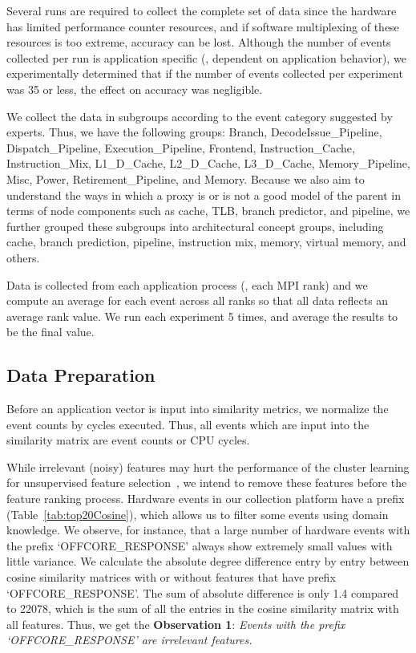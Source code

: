 Several runs are required to collect the complete set of data since the hardware has limited performance counter resources, and if software multiplexing of these resources is too extreme, accuracy can be lost. Although the number of events collected per run is application specific (\ie, dependent on application behavior), we experimentally determined that if the number of events collected per experiment was 35 or less, the effect on accuracy was negligible. 

We collect the data in subgroups according to the event category suggested by experts. Thus, we have the following groups: Branch, DecodeIssue\_Pipeline, Dispatch\_Pipeline, Execution\_Pipeline, Frontend, Instruction\_Cache, Instruction\_Mix, L1\_D\_Cache, L2\_D\_Cache, L3\_D\_Cache, Memory\_Pipeline, Misc, Power, Retirement\_Pipeline, and Memory. Because we also aim to understand the ways in which a proxy is or is not a good model of the parent in terms of node components such as cache, TLB, branch predictor, and pipeline, we further grouped these subgroups into architectural concept groups, including cache, branch prediction, pipeline, instruction mix, memory, virtual memory, and others.

Data is collected from each application process (\ie, each MPI rank) and we compute an average for each event across all ranks so that all data reflects an average rank value. We run each experiment 5 times, and average the results to be the final value.

\subsection{Data Preparation}
\label{sec:prep}
Before an application vector is input into similarity metrics, we normalize the event counts by cycles executed. Thus, all events which are input into the similarity matrix are event counts or CPU cycles.

While irrelevant (noisy) features may hurt the performance of the cluster learning for unsupervised feature selection~\cite{lindenbaum2021differentiable}, we intend to remove these features before the feature ranking process. %
Hardware events in our collection platform have a prefix (Table~\ref{tab:top20Cosine}), which allows us to filter some events using domain knowledge.
We observe, for instance, that a large number of hardware events with the prefix `OFFCORE\_RESPONSE' always show extremely small values with little variance. We calculate the absolute degree difference entry by entry between cosine similarity matrices with or without features that have prefix `OFFCORE\_RESPONSE'. The sum of absolute difference is only 1.4 compared to 22078, which is the sum of all the entries in the cosine similarity matrix with all features. Thus, we get the \textbf{Observation 1}: 
\textit{Events with the prefix `OFFCORE\_RESPONSE' are irrelevant features.} 


